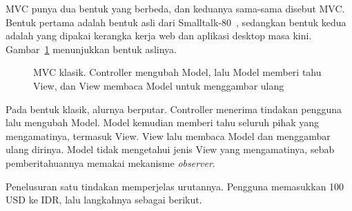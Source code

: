 MVC punya dua bentuk yang berbeda, dan keduanya sama-sama disebut MVC. Bentuk
pertama adalah bentuk asli dari Smalltalk-80~\cite{reenskaug1979mvc,krasner1988cookbook},
sedangkan bentuk kedua adalah yang
dipakai kerangka kerja web dan aplikasi desktop masa kini.
Gambar~\ref{fig:mvc-klasik} menunjukkan bentuk aslinya.

\begin{figure}[htbp]
  \centering
  \caption{MVC klasik. Controller mengubah Model, lalu Model memberi tahu View,
    dan View membaca Model untuk menggambar ulang}
  \label{fig:mvc-klasik}
\end{figure}

Pada bentuk klasik, alurnya berputar. Controller menerima tindakan pengguna lalu
mengubah Model. Model kemudian memberi tahu seluruh pihak yang mengamatinya,
termasuk View. View lalu membaca Model dan menggambar ulang dirinya. Model tidak
mengetahui jenis View yang mengamatinya, sebab pemberitahuannya memakai
mekanisme \textit{observer}.

Penelusuran satu tindakan memperjelas urutannya. Pengguna memasukkan 100 USD ke
IDR, lalu langkahnya sebagai berikut.

